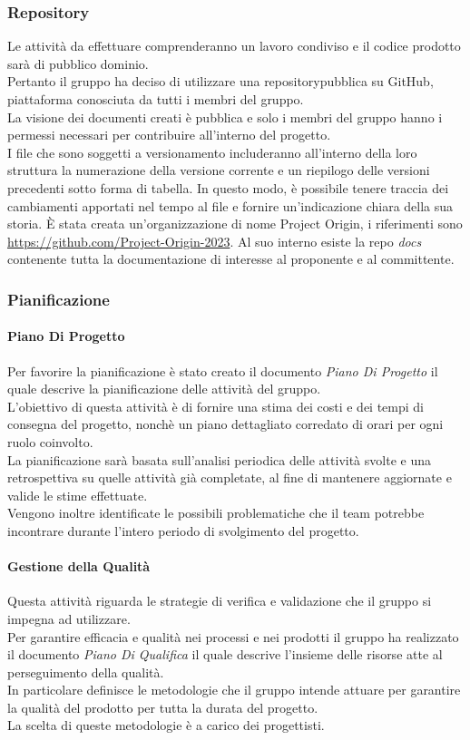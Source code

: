 \subsubsection{Repository} 
Le attività da effettuare comprenderanno un lavoro condiviso e il codice prodotto sarà di pubblico dominio. \\
Pertanto il gruppo ha deciso di utilizzare una repository\glo pubblica su GitHub\glo, piattaforma conosciuta da tutti i membri del gruppo. \\
La visione dei documenti creati è pubblica e solo i membri del gruppo hanno i permessi necessari per contribuire all'interno del progetto. \\
I file che sono soggetti a versionamento includeranno all'interno della loro struttura la numerazione della versione corrente e un riepilogo 
delle versioni precedenti sotto forma di tabella. In questo modo, è possibile tenere traccia dei cambiamenti apportati nel tempo al file e 
fornire un'indicazione chiara della sua storia.
È stata creata un'organizzazione di nome Project Origin, i riferimenti sono \url{https://github.com/Project-Origin-2023}.
Al suo interno esiste la repo \textit{docs} contenente tutta la documentazione di interesse al proponente e al committente.

\subsubsection{Pianificazione}\label{pianificazione}
\paragraph{Piano Di Progetto}
Per favorire la pianificazione è stato creato il documento \textit{Piano Di Progetto} il quale descrive la pianificazione delle attività del gruppo.\\
L’obiettivo di questa attività è di fornire una stima dei costi e dei tempi di consegna del progetto,
nonchè un piano dettagliato corredato di orari per ogni ruolo coinvolto.\\
La pianificazione sarà basata sull’analisi periodica delle attività svolte e una retrospettiva su quelle attività
già completate, al fine di mantenere aggiornate e valide le stime effettuate.\\
Vengono inoltre identificate le possibili problematiche che il team potrebbe incontrare
durante l’intero periodo di svolgimento del progetto.
\paragraph{Gestione della Qualità}
Questa attività riguarda le strategie di verifica e validazione che il gruppo si impegna ad utilizzare.\\
Per garantire efficacia e qualità nei processi e nei prodotti il gruppo ha realizzato il documento \textit{Piano Di Qualifica} il quale descrive l’insieme delle risorse atte al perseguimento della qualità.\\
In particolare definisce le metodologie che il gruppo intende attuare per
garantire la qualità del prodotto per tutta la durata del progetto.\\
La scelta di queste metodologie è a carico dei progettisti.

